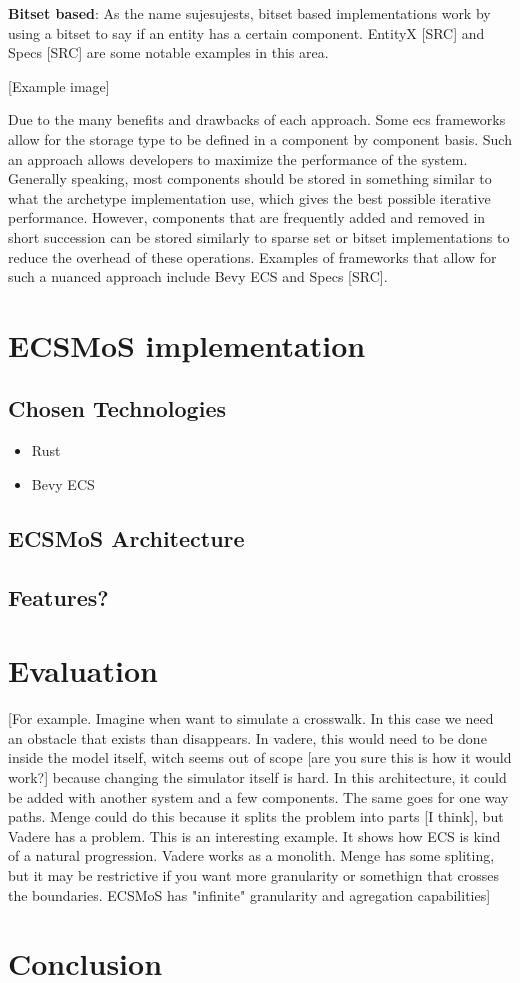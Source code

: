 \documentclass[twoside, 11pt]{article}
\begin{document}
\textbf{Bitset based}: As the name sujesujests, bitset based implementations work by using a bitset to say if an entity has a certain component. EntityX [SRC] and Specs [SRC] are some notable examples in this area.

[Example image]

Due to the many benefits and drawbacks of each approach. Some \gls{ecs} frameworks allow for the storage type to be defined in a component by component basis. Such an approach allows developers to maximize the performance of the system. Generally speaking, most components should be stored in something similar to what the archetype implementation use, which gives the best possible iterative performance. However, components that are frequently added and removed in short succession can be stored similarly to sparse set or bitset implementations to reduce the overhead of these operations. Examples of frameworks that allow for such a nuanced approach include Bevy ECS \cite{bevy} and Specs [SRC].

\section{ECSMoS implementation}

\subsection{Chosen Technologies} \label{chosen_tech}

\begin{itemize}
  \item Rust
  \item Bevy ECS
\end{itemize}

\subsection{ECSMoS Architecture}
\subsection{Features?}

\section{Evaluation}

[For example. Imagine when want to simulate a crosswalk. In this case we need an obstacle that exists than disappears. In vadere, this would need to be done inside the model itself, witch seems out of scope [are you sure this is how it would work?] because changing the simulator itself is hard. In this architecture, it could be added with another system and a few components. The same goes for one way paths. Menge could do this because it splits the problem into parts [I think], but Vadere has a problem. This is an interesting example. It shows how ECS is kind of a natural progression. Vadere works as a monolith. Menge has some spliting, but it may be restrictive if you want more granularity or somethign that crosses the boundaries. ECSMoS has "infinite" granularity and agregation capabilities]
\section{Conclusion}

\printbibliography
\end{document}
